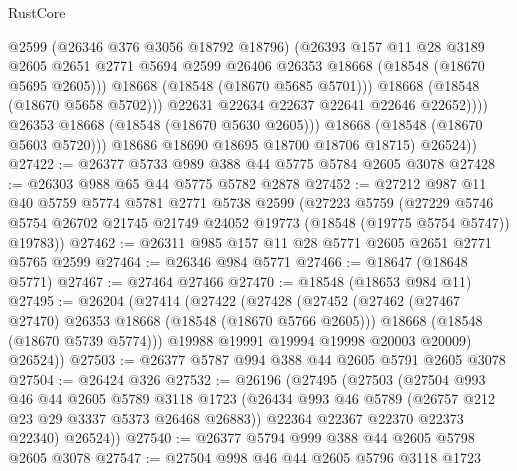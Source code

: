 \begin{lexlean}{RustCore}
\begin{coremodule}
                          @2599
                          (@26346 @376 @3056 @18792 @18796)
                          (@26393
                            @157
                            @11
                            @28
                            @3189
                            @2605
                            @2651
                            @2771
                            @5694
                            @2599
                            @26406
                            @26353
                            @18668
                            (@18548 (@18670 @5695 @2605)))
                          @18668
                          (@18548 (@18670 @5685 @5701)))
                        @18668
                        (@18548 (@18670 @5658 @5702)))
                      @22631
                      @22634
                      @22637
                      @22641
                      @22646
                      @22652))))
              @26353
              @18668
              (@18548 (@18670 @5630 @2605)))
            @18668
            (@18548 (@18670 @5603 @5720)))
          @18686
          @18690
          @18695
          @18700
          @18706
          @18715)
        @26524))
@27422 := @26377 @5733 @989 @388 @44 @5775 @5784 @2605 @3078
@27428 := @26303 @988 @65 @44 @5775 @5782 @2878
@27452 := @27212
    @987
    @11
    @40
    @5759
    @5774
    @5781
    @2771
    @5738
    @2599
    (@27223
      @5759
      (@27229 @5746 @5754 @26702 @21745 @21749 @24052 @19773 (@18548 (@19775 @5754 @5747)) @19783))
@27462 := @26311 @985 @157 @11 @28 @5771 @2605 @2651 @2771 @5765 @2599
@27464 := @26346 @984 @5771
@27466 := @18647 (@18648 @5771)
@27467 := @27464 @27466
@27470 := @18548 (@18653 @984 @11)
@27495 := @26204
    (@27414
      (@27422
        (@27428
          (@27452
            (@27462 (@27467 @27470) @26353 @18668 (@18548 (@18670 @5766 @2605)))
            @18668
            (@18548 (@18670 @5739 @5774)))
          @19988
          @19991
          @19994
          @19998
          @20003
          @20009)
        @26524))
@27503 := @26377 @5787 @994 @388 @44 @2605 @5791 @2605 @3078
@27504 := @26424 @326
@27532 := @26196
    (@27495
      (@27503
        (@27504
          @993
          @46
          @44
          @2605
          @5789
          @3118
          @1723
          (@26434 @993 @46 @5789 (@26757 @212 @23 @29 @3337 @5373 @26468 @26883))
          @22364
          @22367
          @22370
          @22373
          @22340)
        @26524))
@27540 := @26377 @5794 @999 @388 @44 @2605 @5798 @2605 @3078
@27547 := @27504 @998 @46 @44 @2605 @5796 @3118 @1723

\end{coremodule}
\end{lexlean}
